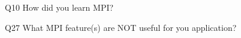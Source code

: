 \begin{description}%
\item{Q10} How did you learn MPI?%
\item{Q27} What MPI feature(s) are NOT useful for you application?%
\end{description}%
